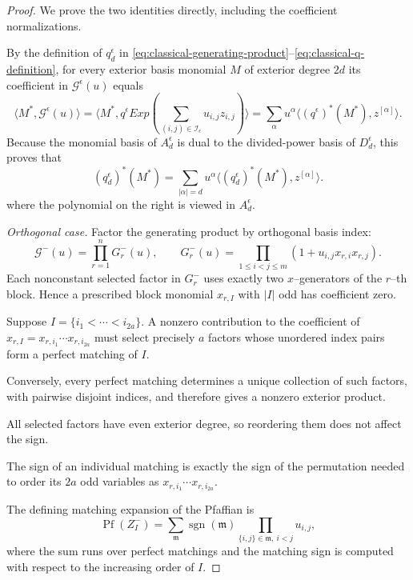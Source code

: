 \documentclass[10pt]{amsart}
\theoremstyle{definition}
\theoremstyle{remark}
\begin{document}
\begin{proof}
We prove the two identities directly, including the coefficient
normalizations.  \smallskip



By the definition of $q_d^\epsilon$ in
\eqref{eq:classical-generating-product}--\eqref{eq:classical-q-definition},
for every exterior basis monomial $M$ of exterior degree $2d$ its coefficient in $\mathcal G^\epsilon(u)$ equals
\[\langle  M^* ,\mathcal G^\epsilon(u)  \rangle= \langle  M^* , q^{ \epsilon}Exp( \sum_{(i,j)\in\mathcal I_\epsilon}u_{i,j} z_{i,j}) \rangle=   
 \sum_{ \alpha }u^\alpha
    \langle(q ^\epsilon)^*(M^*),z^{[\alpha]}\rangle.
\]
Because the monomial basis of $A_d^\epsilon$ is dual to the
divided-power basis of $D_d^\epsilon$, this proves that
\begin{equation}\label{eq:classical-transpose-coefficient-proof}
 (q_d^\epsilon)^*(M^*)=\sum_{|\alpha|=d}u^\alpha
    \langle(q_d^\epsilon)^*(M^*),z^{[\alpha]}\rangle.
\end{equation}
where the polynomial on the right is viewed in $A_d^\epsilon$.

 \medskip
 
\emph{Orthogonal case.}
Factor the generating product by orthogonal basis index:
\[
 \mathcal G^-(u)=\prod_{r=1}^n G^-_r(u),\qquad
 G^-_r(u)=\prod_{1\le i<j\le m}
             (1+u_{i,j}x_{r,i}x_{r,j}).
\]
Each nonconstant selected factor in $G^-_r$ uses exactly two
$x$--generators of the $r$--th block. Hence a prescribed block
monomial $x_{r,I}$ with $|I|$ odd has coefficient zero.\smallskip

Suppose $I=\{i_1<\cdots<i_{2a}\}$. A nonzero contribution
to the coefficient of $x_{r,I}=x_{r,i_1}\cdots x_{r,i_{2a}}$
must select precisely $a$ factors whose unordered index
pairs form a perfect matching of $I$. 

Conversely, every
perfect matching determines a unique collection of such
factors, with pairwise disjoint indices, and therefore
gives a nonzero exterior product.\smallskip



All selected factors have even exterior degree, so
reordering them does not affect the sign. \smallskip

The sign of
an individual matching is exactly the sign of the
permutation needed to order its $2a$ odd variables as
$x_{r,i_1}\cdots x_{r,i_{2a}}$.\smallskip



The defining matching expansion of the Pfaffian is
\[
 \operatorname{Pf}(Z^-_I)=
 \sum_{\mathfrak m}
  \operatorname{sgn}(\mathfrak m)
  \prod_{\{i,j\}\in\mathfrak m,\ i<j}u_{i,j},
\]
where the sum runs over perfect matchings and the
matching sign is computed with respect to the increasing
order of $I$.


\end{proof}
\end{document}
